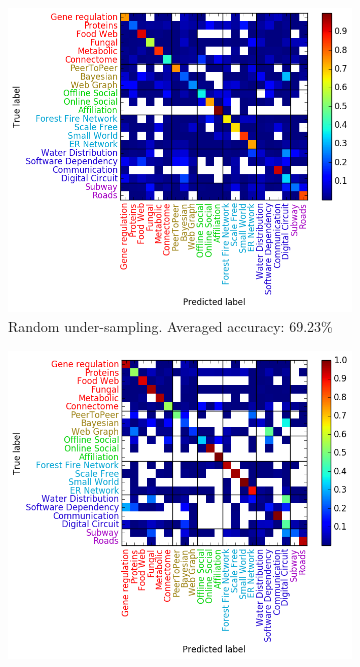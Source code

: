 \documentclass{article}
\begin{document}
\begin{figure}[H]
	\medskip
	\begin{subfigure}{0.48\textwidth}
	\includegraphics[width=\linewidth]{figs/similarity/SubDomain/RandomUnder_all5/confusion_sub_RandomUnder.png}
	\caption{Random under-sampling. Averaged accuracy: 69.23\%} \label{random_under_confusion_sub}
	\end{subfigure}\hspace*{\fill}
	\begin{subfigure}{0.48\textwidth}
	\includegraphics[width=\linewidth]{figs/similarity/SubDomain/SMOTE/confusion_sub_SMOTE.png}

\end{subfigure}
\end{figure}
\end{document}
